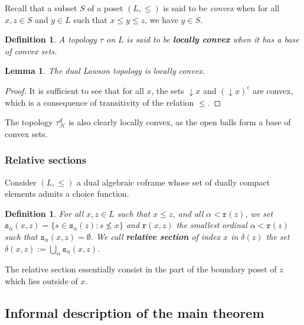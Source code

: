 \documentclass{article}
\newcommand{\comm}[2]{\begin{tcolorbox}[colback=gray!40]\textbf{Comment} (#1) : #2\end{tcolorbox}}
\newtheorem{lemma}[theorem]{Lemma}
\newtheorem{definition}[theorem]{Definition}
\begin{document}
Recall that a subset $S$ of a poset $(L,\le)$ is said to be \textit{convex} when for all $x,z \in S$ and $y \in L$ such that $x \le y \le z$, we have $y \in S$. 

\begin{definition}
    A topology $\tau$ on $L$ is said to be \textbf{locally convex} when it has a base of convex sets.
\end{definition}


\begin{lemma}\label{lemma.lawson.loc.convex}
    The dual Lawson topology is locally convex. 
\end{lemma}

\begin{proof}
    It is sufficient to see that for all $x$, the sets $\mathop{\downarrow}x$ and $(\mathop{\downarrow}x)^c$ are convex, which is a consequence of transitivity of the relation $\le$.
\end{proof}

The topology $\tau_{\mathcal{H}}^d$ is also clearly locally convex, as the open balls form a base of convex sets. 

\subsubsection{Relative sections}

Consider $(L,\le)$ a dual algebraic coframe whose set of dually compact elements admits a choice function.

\begin{definition}
    For all $x,z \in L$ such that $x \le z$, and all $\alpha < \texttt{r}(z)$, we set $\texttt{s}_{\alpha}(x,z) = \{s \in \texttt{s}_{\alpha}(z) : s \not \le x\}$ and $\texttt{r}(x,z)$ the smallest ordinal $\alpha < \texttt{r}(z)$ such that $\texttt{s}_{\alpha}(x,z) = \emptyset$. We call \textbf{relative section} of index $x$ in $\delta(z)$ the set $\delta(x,z) := \bigcup_{\alpha} \texttt{s}_{\alpha}(x,z)$. 
\end{definition}

{The relative section essentially consist in the part of the boundary poset of \(z\) which lies outside of $x$.}



{
\subsection{Informal description of the main theorem\label{section.outline}}
}
\end{document}
